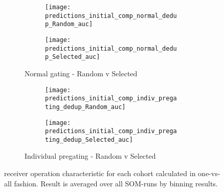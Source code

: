 \documentclass[11pt,a4paper]{article}
\begin{document}
\begin{figure}
   \centering
   \begin{subfigure}{\textwidth}
      \begin{subfigure}{0.5\columnwidth}
         \texttt{[image: predictions\_initial\_comp\_normal\_dedup\_Random\_auc]}
      \end{subfigure}
      \begin{subfigure}{0.5\columnwidth}
         \texttt{[image: predictions\_initial\_comp\_normal\_dedup\_Selected\_auc]}
      \end{subfigure}
      \caption{Normal gating - Random v Selected}
   \end{subfigure}

   \begin{subfigure}{\textwidth}
      \begin{subfigure}{0.5\columnwidth}
         \texttt{[image: predictions\_initial\_comp\_indiv\_pregating\_dedup\_Random\_auc]}
      \end{subfigure}
      \begin{subfigure}{0.5\columnwidth}
         \texttt{[image: predictions\_initial\_comp\_indiv\_pregating\_dedup\_Selected\_auc]}
      \end{subfigure}
      \caption{Individual pregating - Random v Selected}
   \end{subfigure}

   \caption{receiver operation characteristic for each cohort calculated in one-vs-all fashion. Result is averaged over all SOM-runs by binning results.}
\end{figure}
\end{document}
